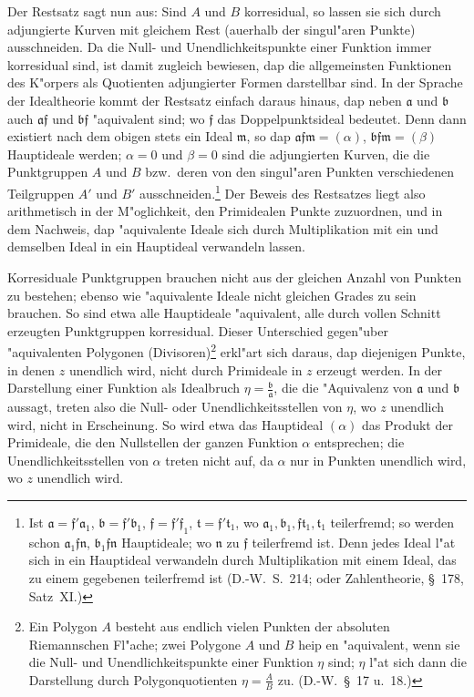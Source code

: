 \documentclass[12pt,a4paper]{article}
\begin{document}
Der Restsatz sagt nun aus: Sind $A$ und $B$ korresidual, so lassen sie sich durch adjungierte Kurven mit gleichem Rest (auerhalb der singul"aren Punkte) ausschneiden. Da die Null- und Unendlichkeitspunkte einer Funktion immer korresidual sind, ist damit zugleich bewiesen, dap die allgemeinsten Funktionen des K"orpers als Quotienten adjungierter Formen darstellbar sind. In der Sprache der Idealtheorie kommt der Restsatz einfach daraus hinaus, dap neben $\mathfrak{a}$ und $\mathfrak{b}$ auch $\mathfrak{a}\mathfrak{f}$ und $\mathfrak{b}\mathfrak{f}$ "aquivalent sind; wo $\mathfrak{f}$ das Doppelpunktsideal bedeutet. Denn dann existiert nach dem obigen stets ein Ideal $\mathfrak{m}$, so dap $\mathfrak{a}\mathfrak{f}\mathfrak{m} = (\alpha)$, $\mathfrak{b}\mathfrak{f}\mathfrak{m} = (\beta)$ Hauptideale werden; $\alpha=0$ und $\beta=0$ sind die adjungierten Kurven, die die Punktgruppen $A$ und $B$ bzw.\ deren von den singul"aren Punkten verschiedenen Teilgruppen $A'$ und $B'$ ausschneiden.\footnote{Ist $\mathfrak{a} = \mathfrak{f}'\mathfrak{a}_1$, $\mathfrak{b} = \mathfrak{f}'\mathfrak{b}_1$, $\mathfrak{f} = \mathfrak{f}'\mathfrak{f}_1$, $\mathfrak{t} = \mathfrak{f}'\mathfrak{t}_1$, wo $\mathfrak{a}_1, \mathfrak{b}_1, \mathfrak{f}\mathfrak{t}_1, \mathfrak{t}_1$ teilerfremd; so werden schon $\mathfrak{a}_1\mathfrak{f}\mathfrak{n}$, $\mathfrak{b}_1\mathfrak{f}\mathfrak{n}$ Hauptideale; wo $\mathfrak{n}$ zu $\mathfrak{f}$ teilerfremd ist. Denn jedes Ideal l"at sich in ein Hauptideal verwandeln durch Multiplikation mit einem Ideal, das zu einem gegebenen teilerfremd ist (D.-W.\ S.~214; oder Zahlentheorie, \S\ 178, Satz~XI.)} Der Beweis des Restsatzes liegt also arithmetisch in der M"oglichkeit, den Primidealen Punkte zuzuordnen, und in dem Nachweis, dap "aquivalente Ideale sich durch Multiplikation mit ein und demselben Ideal in ein Hauptideal verwandeln lassen.

Korresiduale Punktgruppen brauchen nicht aus der gleichen Anzahl von Punkten zu bestehen; ebenso wie "aquivalente Ideale nicht gleichen Grades zu sein brauchen. So sind etwa alle Hauptideale "aquivalent, alle durch vollen Schnitt erzeugten Punktgruppen korresidual. Dieser Unterschied gegen"uber "aquivalenten Polygonen (Divisoren)\footnote{Ein Polygon $A$ besteht aus endlich vielen Punkten der absoluten Riemannschen Fl"ache; zwei Polygone $A$ und $B$ heip en "aquivalent, wenn sie die Null- und Unendlichkeitspunkte einer Funktion $\eta$ sind; $\eta$ l"at sich dann die Darstellung durch Polygonquotienten $\eta = \frac{A}{B}$ zu. (D.-W.\ \S\ 17 u.\ 18.)} erkl"art sich daraus, dap diejenigen Punkte, in denen $z$ unendlich wird, nicht durch Primideale in $z$ erzeugt werden. In der Darstellung einer Funktion als Idealbruch $\eta = \frac{\mathfrak{b}}{\mathfrak{a}}$, die die "Aquivalenz von $\mathfrak{a}$ und $\mathfrak{b}$ aussagt, treten also die Null- oder Unendlichkeitsstellen von $\eta$, wo $z$ unendlich wird, nicht in Erscheinung. So wird etwa das Hauptideal $(\alpha)$ das Produkt der Primideale, die den Nullstellen der ganzen Funktion $\alpha$ entsprechen; die Unendlichkeitsstellen von $\alpha$ treten nicht auf, da $\alpha$ nur in Punkten unendlich wird, wo $z$ unendlich wird.
\end{document}
